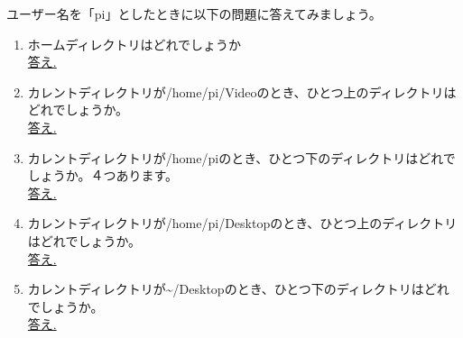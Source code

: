 \begin{tcolorbox}[title=\useOmetoi,breakable]
\begin{figure}[H]
 \centering
 
\end{figure}
ユーザー名を「pi」としたときに以下の問題に答えてみましょう。
\begin{enumerate}
\item ホームディレクトリはどれでしょうか\\
\underline{答え.\hspace{0.8\linewidth}}
\item カレントディレクトリが/home/pi/Videoのとき、ひとつ上のディレクトリはどれでしょうか。\\
\underline{答え.\hspace{0.8\linewidth}}
\item カレントディレクトリが/home/piのとき、ひとつ下のディレクトリはどれでしょうか。４つあります。\\
\underline{答え.\hspace{0.8\linewidth}}
\item カレントディレクトリが/home/pi/Desktopのとき、ひとつ上のディレクトリはどれでしょうか。\\
\underline{答え.\hspace{0.8\linewidth}}
\item カレントディレクトリが\textasciitilde /Desktopのとき、ひとつ下のディレクトリはどれでしょうか。\\
\underline{答え.\hspace{0.8\linewidth}}
\end{enumerate}
\end{tcolorbox}

